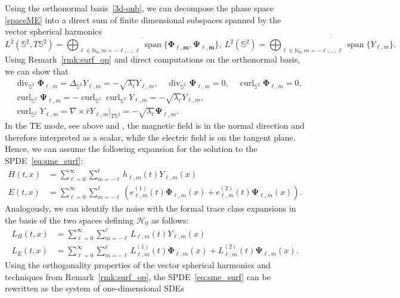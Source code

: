 \documentclass[11pt]{amsart}
\newcommand{\N}{{\mathbb N}}
\newcommand{\IS}{\mathbb{S}}
\newcommand{\Deltalb}{\Delta_{\IS^2}}
\begin{document}
Using the orthonormal basis~\eqref{3d-onb}, we can decompose the phase space \eqref{spaceME} into a direct sum of finite dimensional subspaces spanned by the vector spherical harmonics
$$
L^2(\IS^2,T\IS^2)=\overline{\bigoplus_{\ell \in \N_0,m=-\ell,\dots,\ell}\operatorname{span}\{\mathbf{\Phi_{\ell,m}},\mathbf{\Psi_{\ell, m}}\}},\ L^2(\IS^2)=\overline{\bigoplus_{\ell \in \N_0,m=-\ell,\dots,\ell}\operatorname{span}\{Y_{\ell,m}\}}.
$$
Using Remark~\ref{rmk:surf_op} and direct computations on the orthonormal basis, we can show that
\begin{align*}
	&\operatorname{div}_{\IS^2}\mathbf{\Phi}_{\ell,m}=\Deltalb Y_{\ell,m}=-\sqrt{\lambda_\ell}Y_{\ell,m},\quad \operatorname{div}_{\IS^2}\mathbf{\Psi}_{\ell,m}=0,\quad \operatorname{curl}_{\IS^2}\mathbf{\Phi}_{\ell,m}=0,\\
	&\operatorname{curl}_{\IS^2}\mathbf{\Psi}_{\ell,m}=-\operatorname{curl}_{\IS^2}\operatorname{curl}_{\IS^2}{Y}_{\ell,m}=-\sqrt{\lambda_\ell}Y_{\ell,m},\,\\
	&\operatorname{curl}_{\IS^2}Y_{\ell,m}=\nabla\times \hat r Y_{\ell,m}|_{T\IS^2}=-\sqrt{\lambda_\ell}\mathbf{\Psi}_{\ell,m}.
\end{align*}
In the TE mode, see above and \cite{MR3635830}, the magnetic field is in the normal direction and therefore interpreted as a scalar, while the electric field is on the tangent plane. Hence, we can assume the following expansion for the solution to the SPDE~\eqref{eq:sme_surf}:
\begin{align*}
	H(t,x)&=\sum_{\ell=0}^\infty\sum_{m=-\ell}^\ell h_{\ell,m}(t) Y_{\ell,m}(x)\\
	E(t,x)&=\sum_{\ell=0}^\infty\sum_{m=-\ell}^\ell \left(e^{(1)}_{\ell,m}(t) \mathbf{\Phi}_{\ell,m}(x)+ e^{(2)}_{\ell,m}(t) \mathbf{\Psi}_{\ell,m}(x)\right).
\end{align*}
Analogously, we can identify the noise with the formal trace class expansions
in the basis of the two spaces defining $\mathcal{H}_0$ as follows:
\begin{align*}
	L_H(t,x)&=\sum_{\ell=0}^\infty\sum_{m=-\ell}^\ell L_{\ell,m}(t) Y_{\ell,m}(x)\\
	L_E(t,x)&=\sum_{\ell=0}^\infty\sum_{m=-\ell}^\ell L^{(1)}_{\ell,m}(t) \mathbf{\Phi}_{\ell,m}(x)+ L^{(2)}_{\ell,m}(t) \mathbf{\Psi}_{\ell,m}(x).
\end{align*}
Using the orthogonality properties of the vector spherical harmonics and techniques from Remark~\ref{rmk:surf_op},
the SPDE~\eqref{eq:sme_surf} can be rewritten as the system of one-dimensional SDEs
\end{document}
